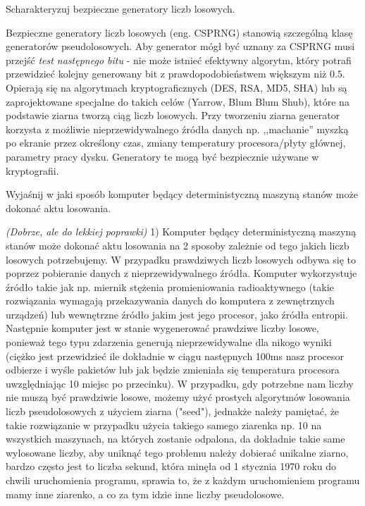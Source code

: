 \documentclass[answers,11pt]{exam}
\newcommand{\fixit}{\textit{(Dobrze, ale do lekkiej poprawki)} }
\begin{document}
\begin{questions}
\question Scharakteryzuj bezpieczne generatory liczb losowych.
\begin{solution}
Bezpieczne generatory liczb losowych (eng. CSPRNG) stanowią szczególną klasę generatorów pseudolosowych. Aby generator mógł być uznany za CSPRNG musi przejść \textit{test następnego bitu} - nie może istnieć efektywny algorytm, który potrafi przewidzieć kolejny generowany bit z prawdopodobieństwem większym niż $0.5$. Opierają się na algorytmach kryptograficznych (DES, RSA, MD5, SHA) lub są zaprojektowane specjalne do takich celów (Yarrow, Blum Blum Shub), które na podstawie ziarna tworzą ciąg liczb losowych. Przy tworzeniu ziarna generator korzysta z możliwie nieprzewidywalnego źródła danych np. ,,machanie'' myszką po ekranie przez określony czas, zmiany temperatury procesora/płyty głównej, parametry pracy dysku. Generatory te mogą być bezpiecznie używane w kryptografii. 
\end{solution}


\question Wyjaśnij w jaki sposób komputer będący deterministyczną maszyną stanów może dokonać aktu losowania.
\begin{solution}
\fixit
1) Komputer będący deterministyczną maszyną stanów może dokonać aktu losowania na 2 sposoby zależnie od tego jakich liczb losowych potrzebujemy. W przypadku prawdziwych liczb losowych odbywa się to poprzez pobieranie danych z nieprzewidywalnego źródła. Komputer wykorzystuje źródło takie jak np. miernik stężenia promieniowania radioaktywnego (takie rozwiązania wymagają przekazywania danych do komputera z zewnętrznych urządzeń) lub wewnętrzne źródło jakim jest jego procesor, jako źródła entropii. Następnie komputer jest w stanie wygenerować prawdziwe liczby losowe, ponieważ tego typu zdarzenia generują nieprzewidywalne dla nikogo wyniki (ciężko jest przewidzieć ile dokładnie w ciągu następnych 100ms nasz procesor odbierze i wyśle pakietów lub jak będzie zmieniała się temperatura procesora uwzględniając 10 miejsc po przecinku). W przypadku, gdy potrzebne nam liczby nie muszą być prawdziwie losowe, możemy użyć prostych algorytmów losowania liczb pseudolosowych z użyciem ziarna ("seed"), jednakże należy pamiętać, że takie rozwiązanie w przypadku użycia takiego samego ziarenka np. 10 na wszystkich maszynach, na których zostanie odpalona, da dokładnie takie same wylosowane liczby, aby uniknąć tego problemu należy dobierać unikalne ziarno, bardzo często jest to liczba sekund, która minęła od 1 stycznia 1970 roku do chwili uruchomienia programu, sprawia to, że z każdym uruchomieniem programu mamy inne ziarenko, a co za tym idzie inne liczby pseudolosowe. 


\end{solution}
\end{questions}
\end{document}

